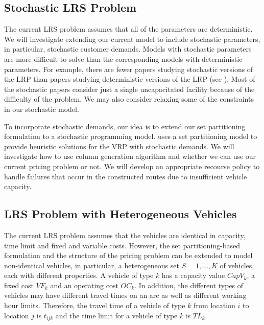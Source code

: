 \subsection{Stochastic LRS Problem}

The current LRS problem assumes that all of the parameters are deterministic. 
We will investigate extending our current model to include stochastic parameters,
in particular, stochastic customer demands. Models with stochastic parameters are 
more difficult to solve than the corresponding models with deterministic 
parameters. For example, there are fewer papers studying stochastic versions
of the LRP than papers studying deterministic versions of the LRP (see \citet{Min}). 
Most of the stochastic papers consider just a single uncapacitated 
facility because of the difficulty of the problem. We may also consider relaxing 
some of the constraints in our stochastic model. 
  
To incorporate stochastic demands, our idea is to extend our set partitioning 
formulation to a stochastic programming model. \citet{Novoa} uses a 
set partitioning model to provide heuristic solutions for the VRP with
stochastic demands. We will investigate how to use column generation algorithm and
whether we can use our current pricing problem or not.  
We will develop an appropriate recourse policy to handle failures that occur in the constructed routes due to 
insufficient vehicle capacity.  


  

\subsection{LRS Problem with Heterogeneous Vehicles}
The current LRS problem assumes that the vehicles are identical in capacity, 
time limit and fixed and variable costs.  However, the set partitioning-based 
formulation and the structure of the pricing problem can be extended to model 
non-identical vehicles, in particular, a heterogeneous set $S={1, ..., K}$ of 
vehicles, each with different properties. A vehicle of type $k$ has a capacity 
value $CapV_k$, a fixed cost $VF_k$ and an operating cost $OC_k$. In addition, 
the different types of vehicles may have different travel times on an arc as 
well as different working hour limits. Therefore, the travel time of a vehicle
of type $k$ from location $i$ to location $j$ is $t_{ijk}$ and the time limit 
for a vehicle of type $k$ is $TL_k$. 
 
